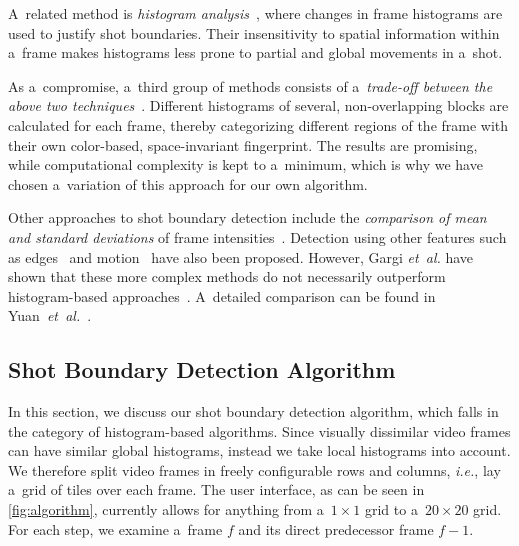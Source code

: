 A~related method is
\emph{histogram analysis}~\cite{otoole1999shotboundary},
where changes in frame histograms are used
to justify shot boundaries.
Their insensitivity to spatial information
within a~frame makes histograms less prone to partial
and global movements in a~shot.

As a~compromise, a~third group of methods consists of
a~\emph{trade-off between the above two
techniques}~\cite{ahmed1999keyframe}.
Different histograms of several, non-overlapping blocks
are calculated for each frame,
thereby categorizing different regions of the frame
with their own color-based, space-invariant fingerprint.
The results are promising, while computational complexity
is kept to a~minimum, which is why we have chosen
a~variation of this approach for our own algorithm.

Other approaches to shot boundary detection include
the \emph{comparison of mean and standard deviations}
of frame intensities~\cite{lienhart1999comparison}.
Detection using other features such as
edges~\cite{zabih1995scenebreaks} and
motion~\cite{bouthemy1997shotchange} have also been proposed.
However, Gargi \emph{et~al.} have shown that
these more complex methods do not necessarily
outperform histogram-based approaches~\cite{gargi2000videoshot}.
A~detailed comparison can be found in
Yuan~\emph{et~al.}~\cite{yuan2007shotboundary}.

\subsection{Shot Boundary Detection Algorithm}
\label{sec:details-of-algo}

In this section, we discuss our shot boundary detection algorithm,
which falls in the category of histogram-based algorithms.
Since visually dissimilar video frames
can have similar global histograms,
instead we take local histograms into account. 
We therefore split video frames in freely configurable
rows and columns, \emph{i.e.}, lay a~grid of tiles over each frame.
The user interface, as can be seen in \autoref{fig:algorithm},
currently allows for anything from a~$\mathit{1} \times \mathit{1}$ 
grid to a~$\mathit{20} \times \mathit{20}$ grid.
For each step, we examine a~frame $\mathit{f}$ and its direct
predecessor frame $\mathit{f - 1}$.


